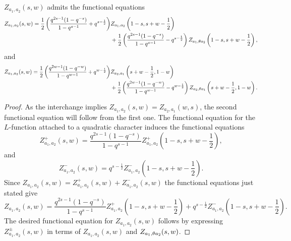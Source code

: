 \documentclass[12pt,reqno,oneside]{amsart}
\begin{document}
    \begin{theorem}\label{thm:double_Dirichlet_series_functional_equation}
        $Z_{a_{1},a_{2}}(s,w)$ admits the functional equations
        \begin{align*}
            Z_{a_{1},a_{2}}(s,w) = \frac{1}{2}\left(\frac{q^{2s-1}(1-q^{-s})}{1-q^{s-1}}+q^{s-\frac{1}{2}}\right)&Z_{a_{1},a_{2}}\left(1-s,s+w-\frac{1}{2}\right) \\
            &+\frac{1}{2}\left(\frac{q^{2s-1}(1-q^{-s})}{1-q^{s-1}}-q^{s-\frac{1}{2}}\right)Z_{a_{1},\theta a_{2}}\left(1-s,s+w-\frac{1}{2}\right),
        \end{align*}
        and
        \begin{align*}
            Z_{a_{1},a_{2}}(s,w) = \frac{1}{2}\left(\frac{q^{2w-1}(1-q^{-w})}{1-q^{w-1}}+q^{w-\frac{1}{2}}\right)&Z_{a_{2},a_{1}}\left(s+w-\frac{1}{2},1-w\right) \\
            &+\frac{1}{2}\left(\frac{q^{2w-1}(1-q^{-w})}{1-q^{w-1}}-q^{w-\frac{1}{2}}\right)Z_{a_{2},\theta a_{1}}\left(s+w-\frac{1}{2},1-w\right).
        \end{align*}
    \end{theorem}
    \begin{proof}
        As the interchange implies $Z_{a_{1},a_{2}}(s,w) = Z_{a_{2},a_{1}}(w,s)$, the second functional equation will follow from the first one. The functional equation for the $L$-function attached to a quadratic character induces the functional equations
        \[
            Z_{a_{1},a_{2}}^{+}(s,w) = \frac{q^{2s-1}(1-q^{-s})}{1-q^{s-1}}Z_{a_{1},a_{2}}^{+}\left(1-s,s+w-\frac{1}{2}\right),
        \]
        and
        \[
            Z_{a_{1},a_{2}}^{-}(s,w) = q^{s-\frac{1}{2}}Z_{a_{1},a_{2}}^{-}\left(1-s,s+w-\frac{1}{2}\right).
        \]
        Since $Z_{a_{1},a_{2}}(s,w) = Z_{a_{1},a_{2}}^{+}(s,w)+Z_{a_{1},a_{2}}^{-}(s,w)$ the functional equations just stated give
        \[
            Z_{a_{1},a_{2}}(s,w) = \frac{q^{2s-1}(1-q^{-s})}{1-q^{s-1}}Z_{a_{1},a_{2}}^{+}\left(1-s,s+w-\frac{1}{2}\right)+q^{s-\frac{1}{2}}Z_{a_{1},a_{2}}^{-}\left(1-s,s+w-\frac{1}{2}\right).
        \]
        The desired functional equation for $Z_{a_{1},a_{2}}(s,w)$ follows by expressing $Z_{a_{1},a_{2}}^{\pm}(s,w)$ in terms of $Z_{a_{1},a_{2}}(s,w)$ and $Z_{a_{1},\theta a_{2}}(s,w)$.
    \end{proof}
\end{document}
